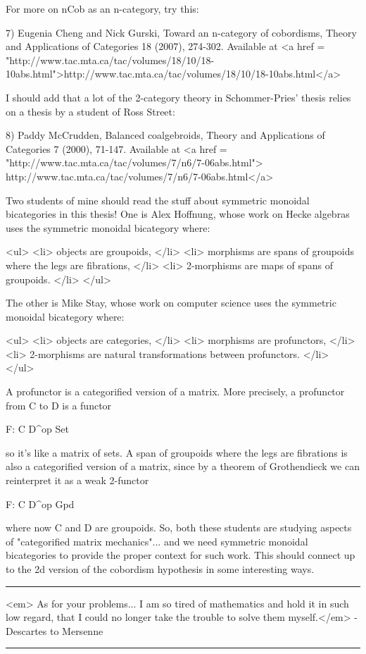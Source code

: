 For more on nCob as an n-category, try this:

7) Eugenia Cheng and Nick Gurski, Toward an n-category of cobordisms,
Theory and Applications of Categories 18 (2007), 274-302.  Available at
<a href = "http://www.tac.mta.ca/tac/volumes/18/10/18-10abs.html">http://www.tac.mta.ca/tac/volumes/18/10/18-10abs.html</a>

I should add that a lot of the 2-category theory in Schommer-Pries'
thesis relies on a thesis by a student of Ross Street:

8) Paddy McCrudden, Balanced coalgebroids, Theory and Applications of
Categories 7 (2000), 71-147.  Available at
<a href = "http://www.tac.mta.ca/tac/volumes/7/n6/7-06abs.html">
http://www.tac.mta.ca/tac/volumes/7/n6/7-06abs.html</a>

Two students of mine should read the stuff about symmetric monoidal
bicategories in this thesis!  One is Alex Hoffnung, whose work on
Hecke algebras uses the symmetric monoidal bicategory where:

<ul>
<li>
objects are groupoids,
</li>
<li>
morphisms are spans of groupoids where the legs are fibrations,
</li>
<li>
2-morphisms are maps of spans of groupoids.
</li>
</ul>

The other is Mike Stay, whose work on computer science uses
the symmetric monoidal bicategory where:

<ul>
<li>
objects are categories,
</li>
<li> 
morphisms are profunctors,
</li>
<li>
2-morphisms are natural transformations between profunctors.
</li>
</ul>

A profunctor is a categorified version of a matrix.  More precisely,
a profunctor from C to D is a functor

F: C \times  D^{op} \to  Set

so it's like a matrix of sets.  A span of groupoids where the
legs are fibrations is also a categorified version of a matrix,
since by a theorem of Grothendieck we can reinterpret it as a
weak 2-functor

F: C \times  D^{op} \to  Gpd

where now C and D are groupoids.  So, both these students are
studying aspects of "categorified matrix mechanics"... and we
need symmetric monoidal bicategories to provide the proper context
for such work.  This should connect up to the 2d version of the
cobordism hypothesis in some interesting ways.

\par\noindent\rule{\textwidth}{0.4pt}

<em>
As for your problems... I am so tired of mathematics and hold it
in such low regard, that I could no longer take the trouble to solve
them myself.</em> - Descartes to Mersenne

\par\noindent\rule{\textwidth}{0.4pt}

